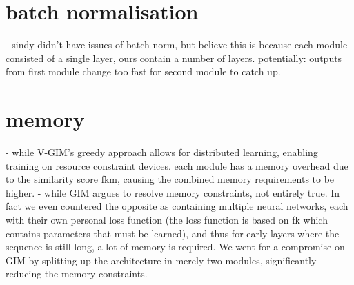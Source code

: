 			
\section{batch normalisation}
		- sindy didn't have issues of batch norm, but believe this is because each module consisted of a single layer, ours contain a number of layers. potentially: outputs from first module change too fast for second module to catch up.
	
\section{memory}
		- while V-GIM's greedy approach allows for distributed learning, enabling training on resource constraint devices. each module has a memory overhead due to the similarity score fkm, causing the combined memory requirements to be higher.
		- while GIM argues to resolve memory constraints, not entirely true. In fact we even countered the opposite as containing multiple neural networks, each with their own personal loss function (the loss function is based on fk which contains parameters that must be learned), and thus for early layers where the sequence is still long, a lot of memory is required. We went for a compromise on GIM by splitting up the architecture in merely two modules, significantly reducing the memory constraints.
	








%








